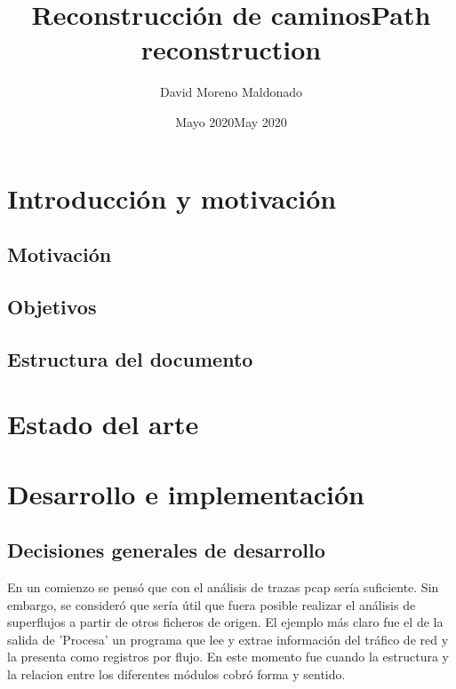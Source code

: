 \documentclass[twoside, 12pt]{epstfg}
\title[spa]{Reconstrucción de caminos}
\title[eng]{Path reconstruction}
\author{David Moreno Maldonado}
\date[spa]{Mayo 2020}
\date[eng]{May 2020}
\begin{document}

\frontmatter

\maketitle[spa]

\makeinnertitle[spa]


\tableofcontents
\clearpage
\listoftables
\clearpage
\listoffigures
\cleardoublepage

\printnoidxglossaries

\mainmatter

\chapter{Introducción y motivación}

\section{Motivación}

\section{Objetivos}

\section{Estructura del documento}

\chapter{Estado del arte}

\chapter{Desarrollo e implementación}
\label{chap:Desarrollo}
\section{Decisiones generales de desarrollo}
En un comienzo se pensó que con el análisis de trazas pcap sería suficiente. Sin embargo, se consideró que sería útil que fuera posible realizar el análisis de superflujos a partir de otros ficheros de origen. El ejemplo más claro fue el de la salida de 'Procesa' un programa que lee y extrae información del tráfico de red y la presenta como registros por flujo. En este momento fue cuando la estructura y la relacion entre los diferentes módulos cobró forma y sentido. 
\end{document}
